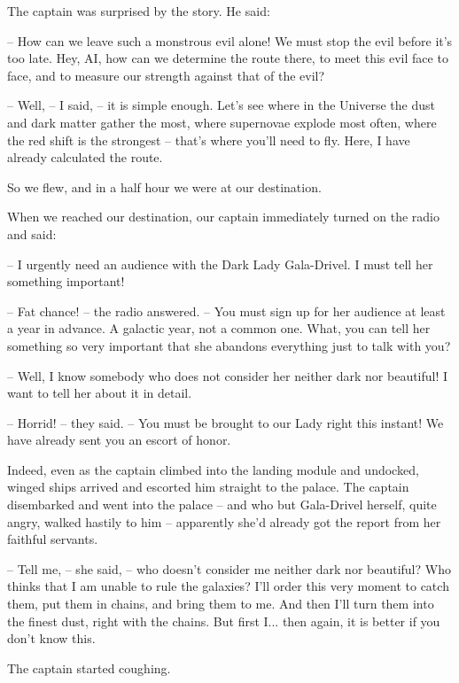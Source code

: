 \documentclass[ebook,oneside,final,openright]{memoir}
\begin{document}
\par
The captain was surprised by the story. He said:\par
– How can we leave such a monstrous evil alone! We must stop the evil before it’s too late. Hey, AI, how can we determine the route there, to meet this evil face to face, and to measure our strength against that of the evil?\par
– Well, – I said, – it is simple enough. Let’s see where in the Universe the dust and dark matter gather the most, where supernovae explode most often, where the red shift is the strongest – that’s where you’ll need to fly. Here, I have already calculated the route.\par
So we flew, and in a half hour we were at our destination.\par
\par
When we reached our destination, our captain immediately turned on the radio and said:\par
– I urgently need an audience with the Dark Lady Gala-Drivel. I must tell her something important! \par
– Fat chance! – the radio answered. – You must sign up for her audience at least a year in advance. A galactic year, not a common one. What, you can tell her something so very important that she abandons everything just to talk with you?\par
– Well, I know somebody who does not consider her neither dark nor beautiful! I want to tell her about it in detail.\par
– Horrid! – they said. – You must be brought to our Lady right this instant! We have already sent you an escort of honor.\par
\par
Indeed, even as the captain climbed into the landing module and undocked, winged ships arrived and escorted him straight to the palace. The captain disembarked and went into the palace – and who but Gala-Drivel herself, quite angry, walked hastily to him – apparently she’d already got the report from her faithful servants.\par
– Tell me, – she said, – who doesn’t consider me neither dark nor beautiful? Who thinks that I am unable to rule the galaxies? I’ll order this very moment to catch them, put them in chains, and bring them to me. And then I’ll turn them into the finest dust, right with the chains. But first I... then again, it is better if you don’t know this.\par
The captain started coughing.\par
\end{document}
